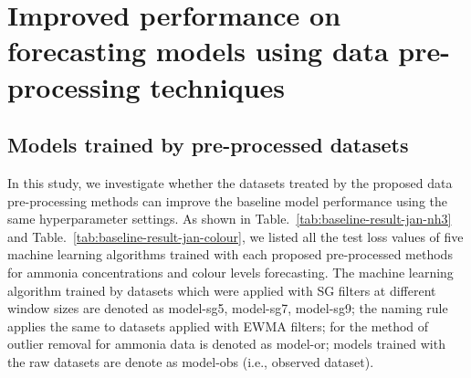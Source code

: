 \section{Improved performance on forecasting models using data pre-processing techniques}
\subsection{Models trained by pre-processed datasets}
In this study, we investigate whether the datasets treated by the proposed data pre-processing methods can improve the baseline model performance using the same hyperparameter settings. As shown in Table.~\ref{tab:baseline-result-jan-nh3} and Table.~\ref{tab:baseline-result-jan-colour}, we listed all the test loss values of five machine learning algorithms trained with each proposed pre-processed methods for ammonia concentrations and colour levels forecasting. The machine learning algorithm trained by datasets which were applied with SG filters at different window sizes are denoted as model-sg5, model-sg7, model-sg9; the naming rule applies the same to datasets applied with EWMA filters; for the method of outlier removal for ammonia data is denoted as model-or; models trained with the raw datasets are denote as model-obs (i.e., observed dataset).

